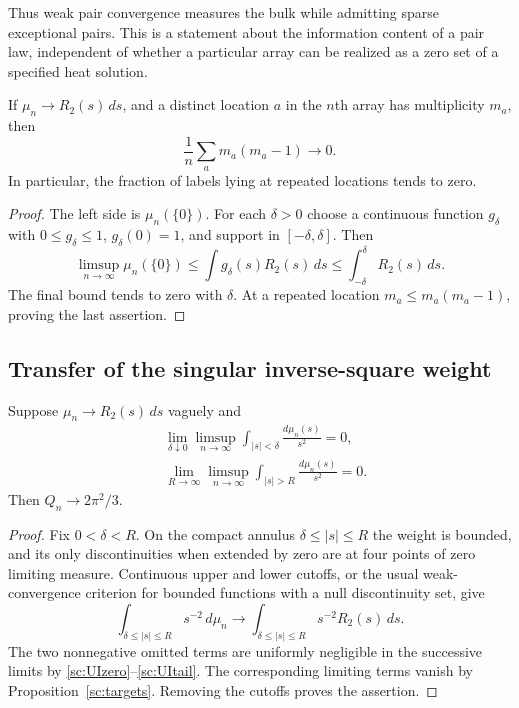 Thus weak pair convergence measures the bulk while admitting sparse
exceptional pairs. This is a statement about the information content of
a pair law, independent of whether a particular array can be realized
as a zero set of a specified heat solution.

\begin{corollary}
\label{sc:densityone}
If $\mu_n\to R_2(s)\,ds$, and a distinct location $a$ in the $n$th
array has multiplicity $m_a$, then
\begin{equation}
 \frac1n\sum_a m_a(m_a-1)\longrightarrow0.
 \label{sc:multiplicitydensity}
\end{equation}
In particular, the fraction of labels lying at repeated locations tends
to zero.
\end{corollary}

\begin{proof}
The left side is $\mu_n(\{0\})$. For each $\delta>0$ choose a continuous
function $g_\delta$ with $0\le g_\delta\le1$, $g_\delta(0)=1$, and
support in $[-\delta,\delta]$. Then
\[
 \limsup_{n\to\infty}\mu_n(\{0\})
 \le\int g_\delta(s)R_2(s)\,ds
 \le\int_{-\delta}^{\delta}R_2(s)\,ds.
\]
The final bound tends to zero with $\delta$. At a repeated location
$m_a\le m_a(m_a-1)$, proving the last assertion.
\end{proof}

\subsection{Transfer of the singular inverse-square weight}
\label{sc:transfer}

\begin{proposition}
\label{sc:UI}
Suppose $\mu_n\to R_2(s)\,ds$ vaguely and
\begin{align}
 &\lim_{\delta\downarrow0}\limsup_{n\to\infty}
    \int_{|s|<\delta}\frac{d\mu_n(s)}{s^2}=0,
 \label{sc:UIzero}\\
 &\lim_{R\to\infty}\limsup_{n\to\infty}
    \int_{|s|>R}\frac{d\mu_n(s)}{s^2}=0.
 \label{sc:UItail}
\end{align}
Then $Q_n\to2\pi^2/3$.
\end{proposition}

\begin{proof}
Fix $0<\delta<R$. On the compact annulus
$\delta\le|s|\le R$ the weight is bounded, and its only discontinuities
when extended by zero are at four points of zero limiting measure.
Continuous upper and lower cutoffs, or the usual weak-convergence
criterion for bounded functions with a null discontinuity set, give
\[
 \int_{\delta\le|s|\le R}s^{-2}\,d\mu_n
 \longrightarrow
 \int_{\delta\le|s|\le R}s^{-2}R_2(s)\,ds.
\]
The two nonnegative omitted terms are uniformly negligible in the
successive limits by \eqref{sc:UIzero}--\eqref{sc:UItail}. The corresponding
limiting terms vanish by Proposition~\ref{sc:targets}. Removing the
cutoffs proves the assertion.
\end{proof}

